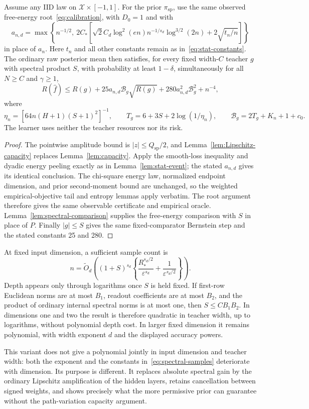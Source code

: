 \begin{theorem}
\label{thm:spectral-oracle}
Assume any IID law on $\mathcal X\times[-1,1]$. For the prior $\pi_{\mathrm{sp}}$, use the same observed free-energy root~\eqref{eq:calibration}, with $D_0=1$ and with
\[
 a_{n,d}=\max\left\{n^{-1/2},\
 2C_*\left[\sqrt2 C_d\log^2(en)n^{-1/s_d}\log^{3/2}(2n)
                 +2\sqrt{t_n/n}\right]\right\}
\]
in place of $a_n$. Here $t_n$ and all other constants remain as in~\eqref{eq:stat-constants}. The ordinary raw posterior mean then satisfies, for every fixed width-$C$ teacher $g$ with spectral product $S$, with probability at least $1-\delta$, simultaneously for all $N\ge C$ and $\gamma\ge1$,
\[
 R(\widehat f)\le R(g)+25a_{n,d}\mathcal B_g\sqrt{R(g)}
                         +280a_{n,d}^2\mathcal B_g^2+n^{-4},
\]
where
\[
 \eta_n=[64n(H+1)(S+1)^2]^{-1},\qquad
 T_g=6+3S+2\log(1/\eta_n),\qquad
 \mathcal B_g=2T_g+K_n+1+c_0.
\]
The learner uses neither the teacher resources nor its risk.
\end{theorem}
\begin{proof}
The pointwise amplitude bound is $|z|\le Q_{\mathrm{sp}}/2$, and Lemma~\ref{lem:Lipschitz-capacity} replaces Lemma~\ref{lem:capacity}. Apply the smooth-loss inequality and dyadic energy peeling exactly as in Lemma~\ref{lem:stat-event}; the stated $a_{n,d}$ gives its identical conclusion. The chi-square energy law, normalized endpoint dimension, and prior second-moment bound are unchanged, so the weighted empirical-objective tail and entropy lemmas apply verbatim. The root argument therefore gives the same observable certificate and empirical oracle. Lemma~\ref{lem:spectral-comparison} supplies the free-energy comparison with $S$ in place of $P$. Finally $|g|\le S$ gives the same fixed-comparator Bernstein step and the stated constants 25 and 280.
\end{proof}

At fixed input dimension, a sufficient sample count is
\begin{equation}
 n=\widetilde O_d\left((1+S)^{s_d}
       \left\{\frac{R_*^{s_d/2}}{\varepsilon^{s_d}}
                        +\frac1{\varepsilon^{s_d/2}}\right\}\right).
 \label{eq:spectral-samples}
\end{equation}
Depth appears only through logarithms once $S$ is held fixed. If first-row Euclidean norms are at most $B_1$, readout coefficients are at most $B_2$, and the product of ordinary internal spectral norms is at most one, then $S\le CB_1B_2$. In dimensions one and two the result is therefore quadratic in teacher width, up to logarithms, without polynomial depth cost. In larger fixed dimension it remains polynomial, with width exponent $d$ and the displayed accuracy powers.

This variant does not give a polynomial jointly in input dimension and teacher width: both the exponent and the constants in~\eqref{eq:spectral-samples} deteriorate with dimension. Its purpose is different. It replaces absolute spectral gain by the ordinary Lipschitz amplification of the hidden layers, retains cancellation between signed weights, and shows precisely what the more permissive prior can guarantee without the path-variation capacity argument.
